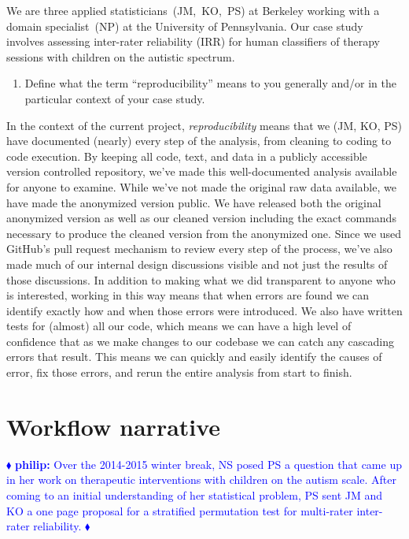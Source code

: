 \documentclass[]{article}
\newcommand{\philip}[1] { \textcolor{blue} {
\ensuremath{\blacklozenge} {\bf philip:}  {#1}
\ensuremath{\blacklozenge} } }
\begin{document}
We are three applied statisticians~(JM,~KO,~PS) at Berkeley working with a
domain specialist~(NP) at the University of Pennsylvania. Our case study
involves assessing inter-rater reliability (IRR) for human classifiers of
therapy sessions with children on the autistic spectrum.

\begin{enumerate}
\def\labelenumi{\arabic{enumi})}
\setcounter{enumi}{1}
\itemsep1pt\parskip0pt
\item
  Define what the term ``reproducibility'' means to you generally and/or
  in the particular context of your case study.
\end{enumerate}

In the context of the current project, \emph{reproducibility} means that
we (JM, KO, PS) have documented (nearly) every step of the analysis,
from cleaning to coding to code execution.
By keeping all code, text, and data in a publicly accessible version
controlled repository, we've made this well-documented analysis available
for anyone to examine.
While we've not made the original raw data available, we have made the
anonymized version public.
We have released both the original anonymized version as well as our cleaned
version including the exact commands necessary to produce the cleaned
version from the anonymized one.
Since we used GitHub's pull request mechanism to review every step of the
process, we've also made much of our internal design discussions visible
and not just the results of those discussions.
In addition to making what we did transparent to anyone who is interested,
working in this way means that when errors are found we can identify
exactly how and when those errors were introduced.
We also have written tests for (almost) all our code, which means we
can have a high level of confidence that as we make changes to our
codebase we can catch any cascading errors that result.
This means we can quickly and easily identify the causes of error, fix
those errors, and rerun the entire analysis from start to finish.

\section{Workflow narrative}\label{workflow-narrative}

\philip{
Over the 2014-2015 winter break, NS posed PS a question that came up in her
work on therapeutic interventions with children on the autism scale.
After coming to an initial understanding of her statistical problem,
PS sent JM and KO a one page proposal for a stratified permutation test for
multi-rater inter-rater reliability.
}
\end{document}
